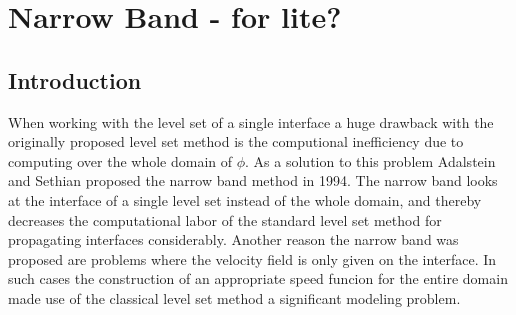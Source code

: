 \chapter{Narrow Band - for lite?}
\section{Introduction}
When working with the level set of a single interface a huge drawback with the originally proposed level set method is the computional inefficiency due to computing over the whole domain of \(\phi\). As a solution to this problem Adalstein and Sethian proposed the narrow band method in 1994\cite{adalsteinsson94}. The narrow band looks at the interface of a single level set instead of the whole domain, and thereby decreases the computational labor of the standard level set method for propagating interfaces considerably. Another reason the narrow band was proposed are problems where the velocity field is only given on the interface. In such cases the construction of an appropriate speed funcion for the entire domain made use of the classical level set method a significant modeling problem.

